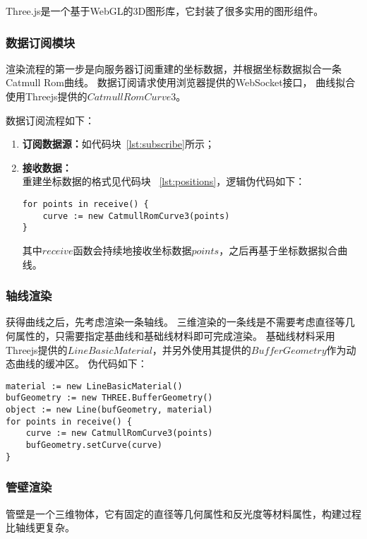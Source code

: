 Three.js是一个基于WebGL的3D图形库\cite{threejs}，它封装了很多实用的图形组件。

\subsubsection{数据订阅模块}
渲染流程的第一步是向服务器订阅重建的坐标数据，并根据坐标数据拟合一条Catmull Rom曲线。
数据订阅请求使用浏览器提供的WebSocket接口\cite{mdn-websocket}，
曲线拟合使用Threejs提供的$CatmullRomCurve3$。

数据订阅流程如下：

\begin{enumerate}
\item \textbf{订阅数据源：}如代码块~\ref{lst:subscribe}所示；
\item \textbf{接收数据：} \\
重建坐标数据的格式见代码块 ~\ref{lst:positions}，逻辑伪代码如下：

\begin{lstlisting}[caption={订阅数据}]
for points in receive() {
    curve := new CatmullRomCurve3(points)
}
\end{lstlisting}

其中$receive$函数会持续地接收坐标数据$points$，之后再基于坐标数据拟合曲线。

\end{enumerate}

\subsubsection{轴线渲染}

获得曲线之后，先考虑渲染一条轴线。
三维渲染的一条线是不需要考虑直径等几何属性的，只需要指定基曲线和基础线材料即可完成渲染。
基础线材料采用Threejs提供的$LineBasicMaterial$，并另外使用其提供的$BufferGeometry$作为动态曲线的缓冲区。
伪代码如下：

\begin{lstlisting}[caption={渲染轴线}]
material := new LineBasicMaterial()
bufGeometry := new THREE.BufferGeometry()
object := new Line(bufGeometry, material)
for points in receive() {
    curve := new CatmullRomCurve3(points)
    bufGeometry.setCurve(curve)
}
\end{lstlisting}

\subsubsection{管壁渲染}

管壁是一个三维物体，它有固定的直径等几何属性和反光度等材料属性，构建过程比轴线更复杂。

